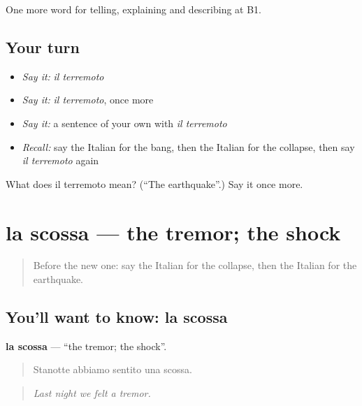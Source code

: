 \begin{grammarlens}[title={What you've built}]
One more word for telling, explaining and describing at B1.
\end{grammarlens}

\subsection*{Your turn}
\begin{itemize}
\raggedright
  \item \emph{Say it:} \emph{il terremoto}
  \item \emph{Say it:} \emph{il terremoto}, once more
  \item \emph{Say it:} a sentence of your own with \emph{il terremoto}
  \item \emph{Recall:} say the Italian for the bang, then the Italian for the collapse, then say \emph{il terremoto} again
\end{itemize}

\begin{tcolorbox}[breakable,colback=teal!4,colframe=teal!35!black,title={Before you move on}]
What does il terremoto mean? (\textquotedblleft{}The earthquake\textquotedblright{}.) Say it once more.
\end{tcolorbox}
\section[la scossa]{la scossa — the tremor; the shock}

\label{lesson:IT-C304-scossa}



\begin{quote}
Before the new one: say the Italian for the collapse, then the Italian for the earthquake.
\end{quote}

\subsection*{You'll want to know: la scossa}
\textbf{la scossa} — \textquotedblleft{}the tremor; the shock\textquotedblright{}.

\begin{quote}
Stanotte abbiamo sentito una scossa.
\end{quote}

\begin{quote}
\emph{Last night we felt a tremor.}
\end{quote}

